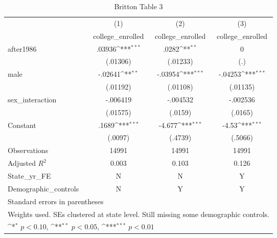 \begin{table}[htbp]\centering
\def\sym#1{\ifmmode^{#1}\else\(^{#1}\)\fi}
\caption{Britton Table 3}
\begin{tabular}{l*{3}{c}}
\hline\hline
                    &\multicolumn{1}{c}{(1)}&\multicolumn{1}{c}{(2)}&\multicolumn{1}{c}{(3)}\\
                    &\multicolumn{1}{c}{college\_enrolled}&\multicolumn{1}{c}{college\_enrolled}&\multicolumn{1}{c}{college\_enrolled}\\
\hline
after1986           &      .03936\sym{***}&       .0282\sym{**} &           0         \\
                    &    (.01306)         &    (.01233)         &         (.)         \\
[1em]
male                &     -.02641\sym{**} &     -.03954\sym{***}&     -.04253\sym{***}\\
                    &    (.01192)         &    (.01108)         &    (.01135)         \\
[1em]
sex\_interaction     &    -.006419         &    -.004532         &    -.002536         \\
                    &    (.01575)         &     (.0159)         &     (.0165)         \\
[1em]
Constant            &       .1689\sym{***}&      -4.677\sym{***}&       -4.53\sym{***}\\
                    &     (.0097)         &     (.4739)         &     (.5066)         \\
\hline
Observations        &       14991         &       14991         &       14991         \\
Adjusted \(R^{2}\)  &       0.003         &       0.103         &       0.126         \\
State\_yr\_FE         &           N         &           N         &           Y         \\
Demographic\_controls&           N         &           Y         &           Y         \\
\hline\hline
\multicolumn{4}{l}{\footnotesize Standard errors in parentheses}\\
\multicolumn{4}{l}{\footnotesize Weights used. SEs clustered at state level. Still missing some demographic controls.}\\
\multicolumn{4}{l}{\footnotesize \sym{*} \(p<0.10\), \sym{**} \(p<0.05\), \sym{***} \(p<0.01\)}\\
\end{tabular}
\end{table}
